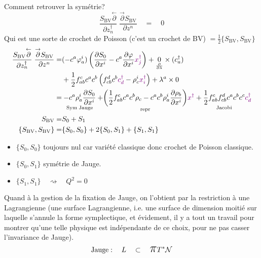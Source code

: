 \documentclass[a4paper,11pt]{article}
\newcommand{\dr}[2]{\frac{\partial {#1}}{\partial{#2}}}
\newcommand{\ppi}{{\mathlarger{\mathlarger{\mathlarger{\pi}}}}}
\begin{document}
\noindent Comment retrouver la symétrie?
$$\frac{S_\mathrm{BV}\overset\leftarrow\partial}{\partial z_n^\dag}\;\frac{\overset\to\partial S_\mathrm{BV}}{\partial z^n} \quad = \quad 0$$
Qui est une sorte de crochet de Poisson (c'est un crochet de BV) $=\frac12 \{S_\mathrm{BV},S_\mathrm{BV}\}$
\begin{align*}
\frac{S_\mathrm{BV}\overset\leftarrow\partial}{\partial z_n^\dag}\;\frac{\overset\to\partial S_\mathrm{BV}}{\partial z^n} =& 
(-c^a\varphi^i_a) \left(\dr{S_0}{x^i} - c^a\dr\varphi{x^i} \color{violet}x^\dag_j\color{black}\right) + \underset{\dr{}\lambda}0\times (c_a^\dag)\\
&+\frac12 f^c_{ab}c^ac^b\left(f^d_{cb}c^b\color{violet}c^\dag_d\color{black}-\rho^i_c\color{violet}x^\dag_i\color{black}\right) + \lambda^a \times 0\\
=& \underset{\mathrm{Sym}\;\mathrm{Jauge}}{-c^a\rho^i_a \dr{S_0}{x^i}} + \underset{\mathrm{repr}}{\left(\frac12 f^c_{ab}c^ac^b\rho_c - c^ac^b\rho^i_a \dr{\rho_b}{x^i}\right)}\color{violet}x^\dag\color{black} + \underset{\mathrm{Jacobi}}{\frac12 f^c_{ab}f^d_{cb} c^ac^bc^c} \color{violet}c_d^\dag\\
S_\mathrm{BV} =& S_0 + S_1\\
\{S_\mathrm{BV},S_\mathrm{BV}\} =& \{S_0,S_0\} + 2\{S_0,S_1\} + \{S_1,S_1\}
\end{align*}
\begin{itemize}
\item $\{S_0,S_0\}$ toujours nul car variété classique donc crochet de Poisson classique.
\item $\{S_0,S_1\}$ symétrie de Jauge.
\item $\{S_1,S_1\} \quad \rightsquigarrow\quad Q^2=0$
\end{itemize}

Quand à la gestion de la fixation de Jauge, on l'obtient par la restriction à une Lagrangienne (une surface Lagrangienne, i.e. une surface de dimension moitié sur laquelle s'annule la forme symplectique, et évidement, il y a tout un travail pour montrer qu'une telle physique est indépendante de ce choix, pour ne pas casser l'invariance de Jauge).
$$\mathrm{Jauge}: \quad L \quad \subset \quad \ppi T^* \mathcal{N}$$
\end{document}
